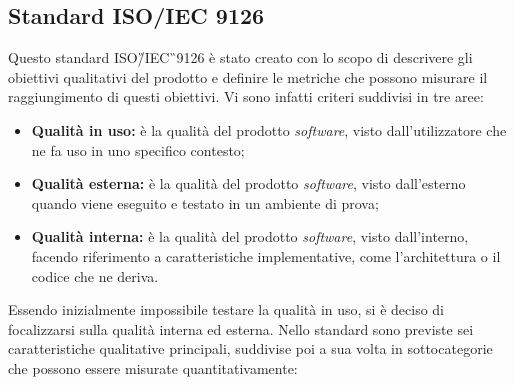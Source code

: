 \subsection{Standard ISO/IEC 9126}

Questo standard ISO\G/IEC\G\ 9126 è stato creato con lo scopo di descrivere gli 
obiettivi qualitativi del prodotto e definire le metriche che possono misurare 
il raggiungimento di questi obiettivi. Vi sono infatti criteri suddivisi in tre 
aree:

\begin{itemize}
	\item \textbf{Qualità in uso:} è la qualità del prodotto \textit{software}, 
	visto dall'utilizzatore che ne fa uso in uno specifico contesto;
	\item \textbf{Qualità esterna:} è la qualità del prodotto 
	\textit{software}, visto dall'esterno quando viene eseguito e testato in un 
	ambiente di prova;
	\item \textbf{Qualità interna:} è la qualità del prodotto 
	\textit{software}, visto dall'interno, facendo riferimento a 
	caratteristiche implementative, come l'architettura o il codice che ne 
	deriva.
\end{itemize}
Essendo inizialmente impossibile testare la qualità in uso, si è deciso di 
focalizzarsi sulla qualità interna ed esterna. Nello standard sono previste sei 
caratteristiche qualitative principali, suddivise poi a sua volta in 
sottocategorie che possono essere misurate quantitativamente:

